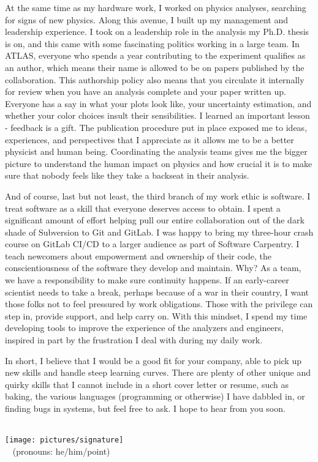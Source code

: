 \documentclass[10pt,letterpaper,sans]{moderncv} %
\makeatletter
\renewcommand*{\makeletterclosing}{
  \@closing\\[0.5em]%
  \texttt{[image: pictures/signature]}\\%
  {\bfseries \@firstname~\@lastname} (pronouns: he/him/point)%
  \ifthenelse{\isundefined{\@enclosure}}{}{%
    \\%
    \vfill%
    {\color{color2}\itshape\enclname: \@enclosure}}}
\makeatother
\begin{document}
At the same time as my hardware work, I worked on physics analyses, searching for signs of new physics. Along this avenue, I built up my management and leadership experience. I took on a leadership role in the analysis my Ph.D. thesis is on, and this came with some fascinating politics working in a large team. In ATLAS, everyone who spends a year contributing to the experiment qualifies as an author, which means their name is allowed to be on papers published by the collaboration. This authorship policy also means that you circulate it internally for review when you have an analysis complete and your paper written up. Everyone has a say in what your plots look like, your uncertainty estimation, and whether your color choices insult their sensibilities. I learned an important lesson - feedback is a gift. The publication procedure put in place exposed me to ideas, experiences, and perspectives that I appreciate as it allows me to be a better physicist and human being. Coordinating the analysis teams gives me the bigger picture to understand the human impact on physics and how crucial it is to make sure that nobody feels like they take a backseat in their analysis.

And of course, last but not least, the third branch of my work ethic is software. I treat software as a skill that everyone deserves access to obtain. I spent a significant amount of effort helping pull our entire collaboration out of the dark shade of Subversion to Git and GitLab. I was happy to bring my three-hour crash course on GitLab CI/CD to a larger audience as part of Software Carpentry. I teach newcomers about empowerment and ownership of their code, the conscientiousness of the software they develop and maintain. Why? As a team, we have a responsibility to make sure continuity happens. If an early-career scientist needs to take a break, perhaps because of a war in their country, I want those folks not to feel pressured by work obligations. Those with the privilege can step in, provide support, and help carry on. With this mindset, I spend my time developing tools to improve the experience of the analyzers and engineers, inspired in part by the frustration I deal with during my daily work.

In short, I believe that I would be a good fit for your company, able to pick up new skills and handle steep learning curves. There are plenty of other unique and quirky skills that I cannot include in a short cover letter or resume, such as baking, the various languages (programming or otherwise) I have dabbled in, or finding bugs in systems, but feel free to ask. I hope to hear from you soon.

\makeletterclosing
\end{document}
